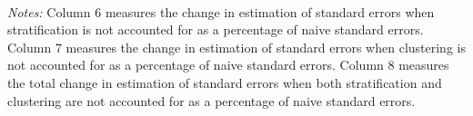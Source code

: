 \usebox{\nssIOPdesigneffecttbl}\\[2pt]
\begin{minipage}{\wd\nssIOPdesigneffecttbl}
\textit{Notes:} Column 6 measures the change in estimation of standard errors when stratification is not accounted for as a percentage of naive standard errors. Column 7 measures the change in estimation of standard errors when clustering is not accounted for as a percentage of naive standard errors. Column 8 measures the total change in estimation of standard errors when both stratification and clustering are not accounted for as a percentage of naive standard errors.
\end{minipage}

